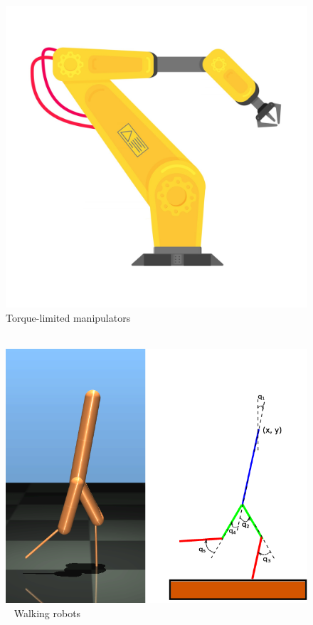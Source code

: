 \documentclass[
]{report}
\begin{document}
\begin{figure}

\begin{minipage}[t]{0.50\linewidth}

{\centering 

\includegraphics{contents/assets/manipulator.jpg} Torque-limited
manipulators

}

\end{minipage}%
%
\begin{minipage}[t]{0.50\linewidth}

{\centering 

~ \includegraphics{contents/assets/underactuation-illustration.png} ~
Walking robots

}

\end{minipage}%

\end{figure}
\end{document}
